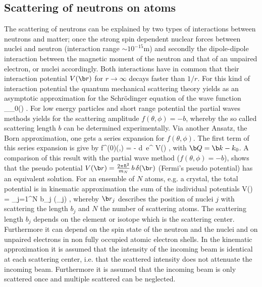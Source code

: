 \subsection{Scattering of neutrons on atoms}
The scattering of neutrons can be explained by two types of interactions between
neutrons and matter; once the strong spin dependent nuclear forces between nuclei
and neutron (interaction range $\sim 10^{-15}$m) and secondly the dipole-dipole
interaction  between the magnetic moment of the neutron and that of an unpaired electron,
or nuclei accordingly. Both interactions have in common that their interaction potential
$V(\B{r})$ for $r \rightarrow \infty$ decays faster than $1/r$. For this kind of interaction
potential the quantum mechanical scattering theory \cite{hittmair} yields as an asymptotic
approximation for the Schr\"odinger equation of the wave function
\BE \displaystyle
\psi_{_0}()
 \displaystyle
{} 
\quad .
\EE
For low energy particles and short range potential the partial waves methods yields for the
scattering amplitude $f(\theta,\phi) = -b$, whereby the so called scattering length $b$ can
be determined experimentally. Via another Ansatz, the Born approximation, one gets a series
expansion for $f(\theta,\phi)$. The first term of this series expansion is give by
\BE \displaystyle
f^{(0)}(\theta,\phi)
= -  \int d\, e^{\imath{}} V()
\quad ,
\EE
with $\B{Q} = \B{k-k}_0$. A comparison of this result with the partial wave method
($f(\theta,\phi)=-b$), shows that the pseudo potential
$V(\B{r}) = \frac{2\pi\hbar^2}{m_N} \, b \, \delta(\B{r})$
(Fermi's pseudo potential) has an equivalent solution. For an ensemble of $N$ atoms,
e.g. a crystal, the total potential is in kinematic approximation the sum of the
individual potentials
\BE \displaystyle
V() =  \sum_{j=1}^{N} b_j \delta(_j)
\quad , \label{fermipot}
\EE
whereby $\B{r}_j$ describes the position of nuclei $j$ with scattering the length $b_j$ and $N$
the number of scattering atoms. The scattering length $b_j$ depends on the element or
isotope which is the scattering center. Furthermore it can depend on the spin state of the
neutron and the nuclei and on unpaired electrons in non fully occupied atomic electron shells.
In the kinematic approximation it is assumed that the intensity of the incoming beam is identical
at each scattering center, i.e. that the scattered intensity does not attenuate the incoming beam.
Furthermore it is assumed that the incoming beam is only scattered once and multiple scattered
can be neglected.

